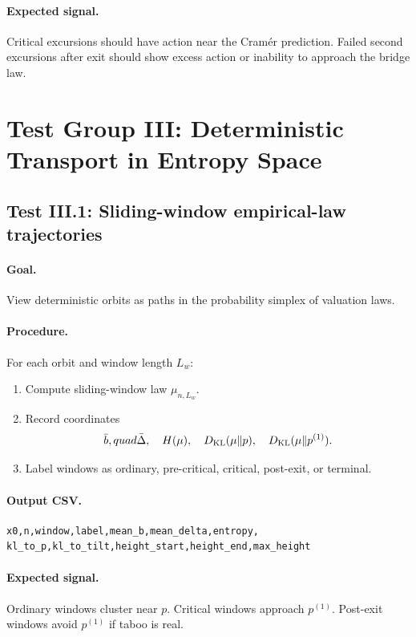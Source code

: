 \documentclass[11pt]{article}
\newcommand{\KL}{D_{\mathrm{KL}}}
\begin{document}
\paragraph{Expected signal.}
Critical excursions should have action near the Cram\'er prediction. Failed second excursions after exit should show excess action or inability to approach the bridge law.

\section{Test Group III: Deterministic Transport in Entropy Space}

\subsection{Test III.1: Sliding-window empirical-law trajectories}

\paragraph{Goal.} View deterministic orbits as paths in the probability simplex of valuation laws.

\paragraph{Procedure.}
For each orbit and window length $L_w$:
\begin{enumerate}
  \item Compute sliding-window law $\mu_{n,L_w}$.
  \item Record coordinates
  \[
    \bar b,\\quad \bar\Delta,
    \quad H(\mu),
    \quad \KL(\mu\|p),
    \quad \KL(\mu\|p^{(1)}).
  \]
  \item Label windows as ordinary, pre-critical, critical, post-exit, or terminal.
\end{enumerate}

\paragraph{Output CSV.}
\begin{verbatim}
x0,n,window,label,mean_b,mean_delta,entropy,
kl_to_p,kl_to_tilt,height_start,height_end,max_height
\end{verbatim}

\paragraph{Expected signal.}
Ordinary windows cluster near $p$. Critical windows approach $p^{(1)}$. Post-exit windows avoid $p^{(1)}$ if taboo is real.
\end{document}

